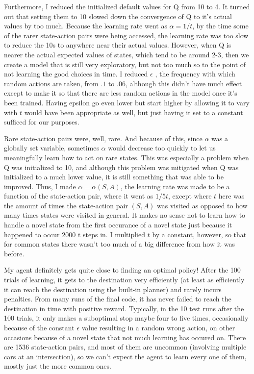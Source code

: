 \documentclass{amsart}
\begin{document}
Furthermore, I reduced the initialized default values for Q from 10 to 4.  It turned out that setting them to 10 slowed down the convergence of Q to it's actual values by too much.  Because the learning rate went as $\alpha = 1/t$, by the time some of the rarer state-action pairs were being accessed, the learning rate was too slow to reduce the 10s to anywhere near their actual values.  However, when Q is nearer the actual expected values of states, which tend to be around 2-3, then we create a model that is still very exploratory, but not too much so to the point of not learning the good choices in time.   I reduced $\epsilon$ , the frequency with which random actions are taken, from $.1$ to $.06$, although this didn't have much effect except to make it so that there are less random actions in the model once it's been trained.  Having epsilon go even lower but start higher by allowing it to vary with $t$ would have been appropriate as well, but just having it set to a constant sufficed for our purposes.

Rare state-action pairs were, well, rare.  And because of this, since $\alpha$ was a globally set variable, sometimes $\alpha$ would decrease too quickly to let us meaningfully learn how to act on rare states.  This was especially a problem when Q was initialized to 10, and although this problem was mitigated  when Q was initialized to a much lower value, it is still something that was able to be improved.  Thus, I made $\alpha = \alpha(S,A)$, the learning rate was made to be a function of the state-action pair, where it went as $1/5t$, except where $t$ here was the amount of times the state-action pair $(S,A)$ was visited as opposed to how many times states were visited in general.  It makes no sense not to learn how to handle a novel state from the first occurance of a novel state just because it happened to occur 2000 t steps in.  I multiplied $t$ by a constant, however, so that for common states there wasn't too much of a big difference from how it was before.

My agent definitely gets quite close to finding an optimal policy!  After the 100 trials of learning, it gets to the destination very efficiently (at least as efficiently it can reach the destination using the built-in planner) and rarely incurs penalties.  From many runs of the final code, it has never failed to reach the destination in time with positive reward.  Typically, in the 10 test runs after the 100 trials, it only makes a suboptimal stop maybe four to five times, occasionally because of the constant $\epsilon$ value resulting in a random wrong action, on other occasions because of a novel state that not much learning has occured on.  There are 1536 state-action pairs, and most of them are uncommon (involving multiple cars at an intersection), so we can't expect the agent to learn every one of them, mostly just the more common ones.
\end{document}
